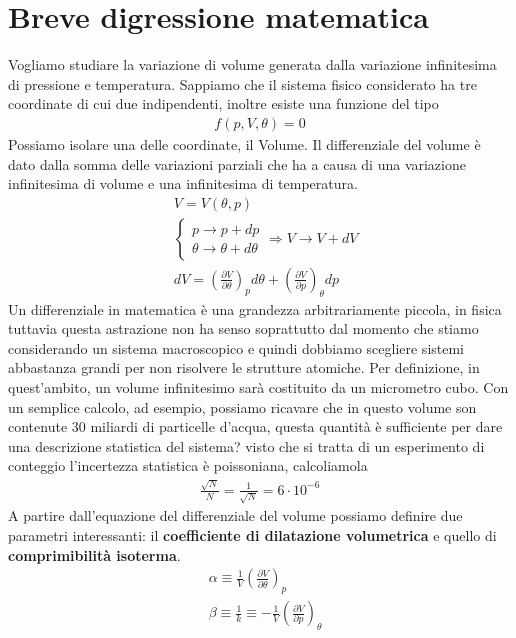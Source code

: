 \documentclass[10pt,a4paper]{article}
\begin{document}
\section{Breve digressione matematica}
Vogliamo studiare la variazione di volume generata dalla variazione infinitesima di pressione e temperatura. Sappiamo che il sistema fisico considerato ha tre coordinate di cui due indipendenti, inoltre esiste una funzione del tipo
\begin{align*} 
	f(p, V, \theta) = 0
\end{align*} 
Possiamo isolare una delle coordinate, il Volume. Il differenziale del volume è dato dalla somma delle variazioni parziali che ha a causa di una variazione infinitesima di volume e una infinitesima di temperatura. 
\begin{align*} 
	&V = V(\theta, p)\\
	&\begin{cases}
		p\rightarrow p + dp\\
		\theta \rightarrow \theta + d\theta
	\end{cases} \Rightarrow V \rightarrow V + dV\\
	&dV = (\frac{\partial V}{\partial \theta})_p d\theta + (\frac{\partial V}{\partial p})_{\theta} dp
\end{align*} 
Un differenziale in matematica è una grandezza arbitrariamente piccola, in fisica tuttavia questa astrazione non ha senso soprattutto dal momento che stiamo considerando un sistema macroscopico e quindi dobbiamo scegliere sistemi abbastanza grandi per non risolvere le  strutture atomiche. Per definizione, in quest'ambito, un volume infinitesimo sarà costituito da un micrometro cubo. Con un semplice calcolo, ad esempio, possiamo ricavare che in questo volume son contenute 30 miliardi di particelle d'acqua, questa quantità è sufficiente per dare una descrizione statistica del sistema? visto che si tratta di un esperimento di conteggio l'incertezza statistica è poissoniana, calcoliamola
\begin{align*} 
	\frac{\sqrt{N}}{N} = \frac{1}{\sqrt{N}} = 6 \cdot 10^{-6}
\end{align*} 
A partire dall'equazione del differenziale del volume possiamo definire due parametri interessanti: il \textbf{coefficiente di dilatazione volumetrica} e quello di \textbf{comprimibilità isoterma}.
\begin{align*} 
	&\alpha \equiv \frac{1}{V}( \frac{\partial V}{\partial \theta})_p\\
	&\beta \equiv \frac{1}{k} \equiv - \frac{1}{V}( \frac{\partial V}{\partial p})_{\theta}
\end{align*} 
\end{document}
